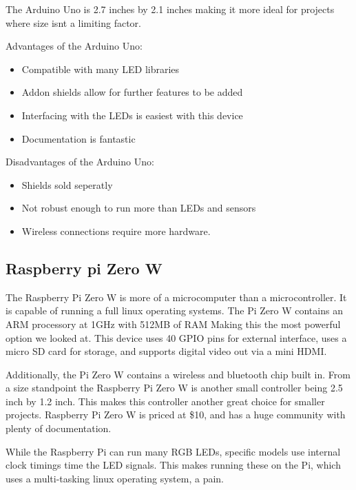 \documentclass[onecolumn, draftclsnofoot,10pt, compsoc]{IEEEtran}
\begin{document}
		\vspace{5mm}
		\noindent The Arduino Uno is 2.7 inches by 2.1 inches making it more ideal for
		projects where size isnt a limiting factor.

		\vspace{5mm}
		Advantages of the Arduino Uno:
		\begin{itemize}
			\item Compatible with many LED libraries
			\item Addon shields allow for further features to be added
			\item Interfacing with the LEDs is easiest with this device
			\item Documentation is fantastic
		\end{itemize}
		Disadvantages of the Arduino Uno:
		\begin{itemize}
			\item Shields sold seperatly
			\item Not robust enough to run more than LEDs and sensors
			\item Wireless connections require more hardware.
		\end{itemize}
		\subsection{Raspberry pi Zero W}

		\vspace{5mm}
		\noindent The Raspberry Pi Zero W is more of a microcomputer than a microcontroller.
		It is capable of running a full linux operating systems. The Pi Zero W
		contains an ARM processory at 1GHz with 512MB of RAM Making this the most
		powerful option we looked at. This device uses 40 GPIO pins for
		external interface, uses a micro SD card for storage, and supports digital
		video out via a mini HDMI\cite[Pg 2]{pizero}.

		\vspace{5mm}
		\noindent Additionally, the Pi Zero W contains a wireless and bluetooth chip built in.
		From a size standpoint the Raspberry Pi Zero W is another small controller
		being 2.5 inch by 1.2 inch. This makes this controller another great choice
		for smaller projects. Raspberry Pi Zero W is priced at \$10, and has a huge
		community with plenty of documentation.

		\vspace{5mm}
		\noindent While the Raspberry Pi can run many RGB LEDs, specific models use internal
		clock timings time the LED signals. This makes running these on the Pi,
		which uses a multi-tasking linux operating system, a pain.
\end{document}
